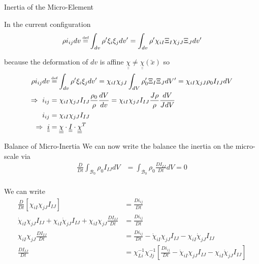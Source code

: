 \documentclass[11pt]{beamer}
\newcommand{\TEN}[1]{\underline{\underline{#1}}}
\newcommand{\VEC}[1]{\utilde{#1}}
\newcommand\defeq{\mathrel{\stackrel{\makebox[0pt]{\mbox{\normalfont\tiny def}}}{=}}}
\begin{document}
\begin{frame}{Inertia of the Micro-Element}

In the current configuration
\begin{align*}
\rho i_{ij} dv &\defeq \int_{dv} \rho' \xi_i \xi_j dv' = \int_{dv} \rho' \chi_{iI} \Xi_I \chi_{jJ} \Xi_J dv'\\
\end{align*}

because the deformation of $dv$ is affine $\TEN{\chi} \neq \TEN{\chi}(\VEC{x})$ so
\begin{align*}
\rho i_{ij} dv &\defeq \int_{dv} \rho' \xi_i \xi_j dv' = \chi_{iI} \chi_{jJ} \int_{dV} \rho_0' \Xi_I \Xi_J dV' = \chi_{iI} \chi_{jJ} \rho_0 I_{IJ} dV\\
\Rightarrow\ i_{ij} &= \chi_{iI} \chi_{jJ} I_{IJ} \frac{\rho_0}{\rho} \frac{dV}{dv} = \chi_{iI} \chi_{jJ} I_{IJ} \frac{J \rho}{\rho} \frac{dV}{J dV}\\
i_{ij} &= \chi_{iI} \chi_{jJ} I_{IJ}\\
\Rightarrow\ \TEN{i} &= \TEN{\chi} \cdot \TEN{I} \cdot \TEN{\chi}^T\\
\end{align*}

\end{frame}


\begin{frame}{Balance of Micro-Inertia}
We can now write the balance the inertia on the micro-scale via
\begin{align*}
\frac{D}{Dt} \int_{\mathcal{B}_0} \rho_0 I_{IJ} dV &= \int_{\mathcal{B}_0} \rho_0 \frac{D I_{IJ}}{Dt} dV = 0\\
\end{align*}



We can write
\begin{align*}
\frac{D}{Dt}\left[\chi_{iI} \chi_{jJ}I_{IJ}\right] &= \frac{D i_{ij}}{Dt}\\
\dot{\chi}_{iI} \chi_{jJ} I_{IJ} + \chi_{iI} \dot{\chi}_{jJ} I_{IJ} + \chi_{iI} \chi_{jJ} \frac{DI_{IJ}}{Dt} &= \frac{D i_{ij}}{Dt}\\
\chi_{iI} \chi_{jJ} \frac{D I_{IJ}}{Dt} &= \frac{D i_{ij}}{Dt} - \dot{\chi}_{iI} \chi_{jJ} I_{IJ} - \chi_{iI} \dot{\chi}_{jJ} I_{IJ}\\
\frac{D I_{IJ}}{Dt} &= \chi_{Li}^{-1} \chi_{Jj}^{-1} \left[\frac{D i_{ij}}{Dt} - \dot{\chi}_{iI} \chi_{jJ} I_{IJ} - \chi_{iI} \dot{\chi}_{jJ} I_{IJ}\right]\\
\end{align*}

\end{frame}
\end{document}
